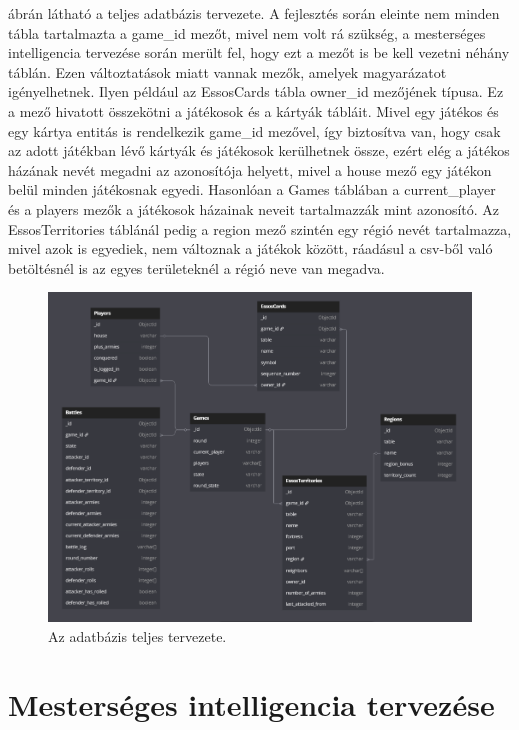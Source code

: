 \documentclass[
]{thesis-ekf}
\theoremstyle{definition}
\theoremstyle{remark}
\begin{document}
	 ábrán látható a teljes adatbázis tervezete. A fejlesztés során eleinte nem minden tábla tartalmazta a game\_id mezőt, mivel nem volt rá szükség, a mesterséges intelligencia tervezése során merült fel, hogy ezt a mezőt is be kell vezetni néhány táblán. Ezen változtatások miatt vannak mezők, amelyek magyarázatot igényelhetnek. Ilyen például az EssosCards tábla owner\_id mezőjének típusa. Ez a mező hivatott összekötni a játékosok és a kártyák tábláit. Mivel egy játékos és egy kártya entitás is rendelkezik game\_id mezővel, így biztosítva van, hogy csak az adott játékban lévő kártyák és játékosok kerülhetnek össze, ezért elég a játékos házának nevét megadni az azonosítója helyett, mivel a house mező egy játékon belül minden játékosnak egyedi. Hasonlóan a Games táblában a current\_player és a players mezők a játékosok házainak neveit tartalmazzák mint azonosító. Az EssosTerritories táblánál pedig a region mező szintén egy régió nevét tartalmazza, mivel azok is egyediek, nem változnak a játékok között, ráadásul a csv-ből való betöltésnél is az egyes területeknél a régió neve van megadva.
	
	\begin{figure}[ht!]
		\centering
		\includegraphics[width=16cm]{DB.png}
		\caption{Az adatbázis teljes tervezete.}
		\label{database}
	\end{figure}
	
	\chapter{Mesterséges intelligencia tervezése}
	
\end{document}
